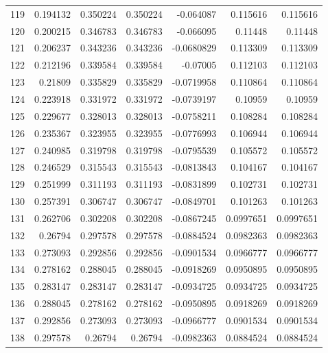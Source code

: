 \begin{tabular}{rrrrrrr}
 119 &  0.194132    & 0.350224    & 0.350224    & -0.064087    & 0.115616    & 0.115616    \\
 120 &  0.200215    & 0.346783    & 0.346783    & -0.066095    & 0.11448     & 0.11448     \\
 121 &  0.206237    & 0.343236    & 0.343236    & -0.0680829   & 0.113309    & 0.113309    \\
 122 &  0.212196    & 0.339584    & 0.339584    & -0.07005     & 0.112103    & 0.112103    \\
 123 &  0.21809     & 0.335829    & 0.335829    & -0.0719958   & 0.110864    & 0.110864    \\
 124 &  0.223918    & 0.331972    & 0.331972    & -0.0739197   & 0.10959     & 0.10959     \\
 125 &  0.229677    & 0.328013    & 0.328013    & -0.0758211   & 0.108284    & 0.108284    \\
 126 &  0.235367    & 0.323955    & 0.323955    & -0.0776993   & 0.106944    & 0.106944    \\
 127 &  0.240985    & 0.319798    & 0.319798    & -0.0795539   & 0.105572    & 0.105572    \\
 128 &  0.246529    & 0.315543    & 0.315543    & -0.0813843   & 0.104167    & 0.104167    \\
 129 &  0.251999    & 0.311193    & 0.311193    & -0.0831899   & 0.102731    & 0.102731    \\
 130 &  0.257391    & 0.306747    & 0.306747    & -0.0849701   & 0.101263    & 0.101263    \\
 131 &  0.262706    & 0.302208    & 0.302208    & -0.0867245   & 0.0997651   & 0.0997651   \\
 132 &  0.26794     & 0.297578    & 0.297578    & -0.0884524   & 0.0982363   & 0.0982363   \\
 133 &  0.273093    & 0.292856    & 0.292856    & -0.0901534   & 0.0966777   & 0.0966777   \\
 134 &  0.278162    & 0.288045    & 0.288045    & -0.0918269   & 0.0950895   & 0.0950895   \\
 135 &  0.283147    & 0.283147    & 0.283147    & -0.0934725   & 0.0934725   & 0.0934725   \\
 136 &  0.288045    & 0.278162    & 0.278162    & -0.0950895   & 0.0918269   & 0.0918269   \\
 137 &  0.292856    & 0.273093    & 0.273093    & -0.0966777   & 0.0901534   & 0.0901534   \\
 138 &  0.297578    & 0.26794     & 0.26794     & -0.0982363   & 0.0884524   & 0.0884524   \\

\end{tabular}
